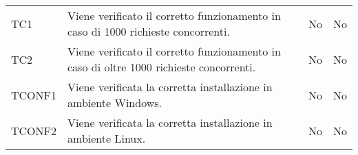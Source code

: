 \begin{longtable}{
		>{\centering}p{}
		>{}p{}
		>{\centering}p{}
		>{\centering}p{} }
		TC1 & Viene verificato il corretto funzionamento in caso di 1000 richieste concorrenti. &
		No &
		No \tabularnewline
		



		TC2 & Viene verificato il corretto funzionamento in caso di oltre 1000 richieste concorrenti. &
		No &
		No \tabularnewline
		
		
		
		
		TCONF1 & Viene verificata la corretta installazione in ambiente Windows. &
		No &
		No \tabularnewline
		
		TCONF2 & Viene verificata la corretta installazione in ambiente Linux. &
		No &
		No \tabularnewline


\end{longtable}
